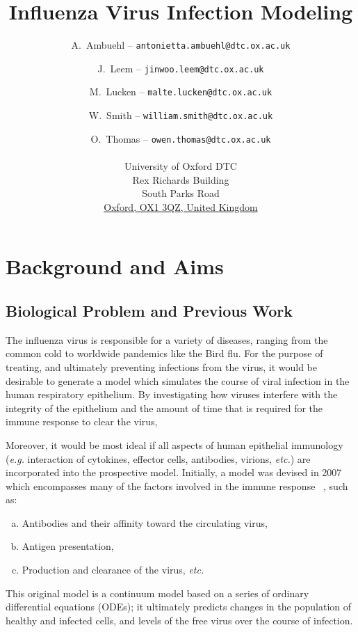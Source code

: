 \documentclass[a4paper, 12pt]{report}
\title{Influenza Virus Infection Modeling}
\author{A.~Ambuehl -- \texttt{antonietta.ambuehl@dtc.ox.ac.uk} \and J.~Leem -- \texttt{jinwoo.leem@dtc.ox.ac.uk} \and M.~Lucken -- \texttt{malte.lucken@dtc.ox.ac.uk} \and W.~Smith -- \texttt{william.smith@dtc.ox.ac.uk} \and O.~Thomas -- \texttt{owen.thomas@dtc.ox.ac.uk} \\\\
University of Oxford DTC \\
Rex Richards Building \\
South Parks Road\\
\underline{Oxford, OX1 3QZ, United Kingdom}\\
}
\begin{document}
\maketitle

%

\chapter{Background and Aims} %
\section{Biological Problem and Previous Work}
The influenza virus is responsible for a variety of diseases, ranging from the common cold to worldwide pandemics like the Bird flu. For the purpose of treating, and ultimately preventing infections from the virus, it would be desirable to generate a model which simulates the course of viral infection in the human respiratory epithelium. By investigating how viruses interfere with the integrity of the epithelium and the amount of time that is required for the immune response to clear the virus, 

Moreover, it would be most ideal if all aspects of human epithelial immunology (\emph{e.g.} interaction of cytokines, effector cells, antibodies, virions, \emph{etc.}) are incorporated into the prospective model. Initially, a model was devised in 2007 which encompasses many of the factors involved in the immune response ~\cite{Hancioglu}, such as:
\begin{enumerate}[a.]
\item Antibodies and their affinity toward the circulating virus,
\item Antigen presentation,
\item Production and clearance of the virus, \emph{etc.}
\end{enumerate}

This original model is a continuum model based on a series of ordinary differential equations (ODEs); it ultimately predicts changes in the population of healthy and infected cells, and levels of the free virus over the course of infection. \\
\end{document}
